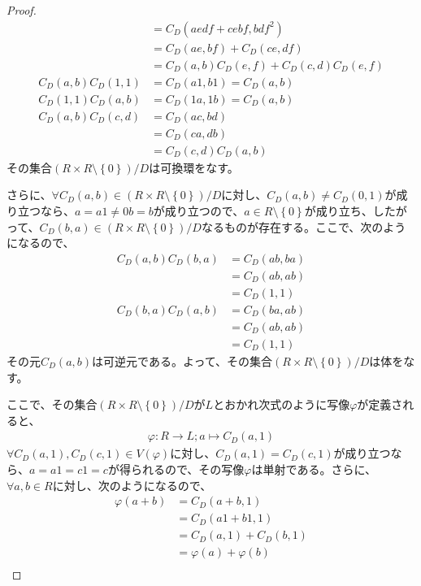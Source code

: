 \documentclass[dvipdfmx]{jsarticle}
\begin{document}
\begin{proof}
\begin{align*}
&= C_{D}\left( aedf + cebf,bdf^{2} \right)\\
&= C_{D}(ae,bf) + C_{D}(ce,df)\\
&= C_{D}(a,b)C_{D}(e,f) + C_{D}(c,d)C_{D}(e,f)\\
C_{D}(a,b)C_{D}(1,1) &= C_{D}(a1,b1) = C_{D}(a,b)\\
C_{D}(1,1)C_{D}(a,b) &= C_{D}(1a,1b) = C_{D}(a,b)\\
C_{D}(a,b)C_{D}(c,d) &= C_{D}(ac,bd)\\
&= C_{D}(ca,db)\\
&= C_{D}(c,d)C_{D}(a,b)
\end{align*}
その集合${\left( R \times R \setminus \left\{ 0 \right\} \right)}/{D}$は可換環をなす。\par
さらに、$\forall C_{D}(a,b) \in {\left( R \times R \setminus \left\{ 0 \right\} \right)}/{D}$に対し、$C_{D}(a,b) \neq C_{D}(0,1)$が成り立つなら、$a = a1 \neq 0b = b$が成り立つので、$a \in R \setminus \left\{ 0 \right\}$が成り立ち、したがって、$C_{D}(b,a) \in {\left( R \times R \setminus \left\{ 0 \right\} \right)}/{D}$なるものが存在する。ここで、次のようになるので、
\begin{align*}
C_{D}(a,b)C_{D}(b,a) &= C_{D}(ab,ba)\\
&= C_{D}(ab,ab)\\
&= C_{D}(1,1)\\
C_{D}(b,a)C_{D}(a,b) &= C_{D}(ba,ab)\\
&= C_{D}(ab,ab)\\
&= C_{D}(1,1)
\end{align*}
その元$C_{D}(a,b)$は可逆元である。よって、その集合${\left( R \times R \setminus \left\{ 0 \right\} \right)}/{D}$は体をなす。\par
ここで、その集合${\left( R \times R \setminus \left\{ 0 \right\} \right)}/{D}$が$L$とおかれ次式のように写像$\varphi$が定義されると、
\begin{align*}
\varphi:R \rightarrow L;a \mapsto C_{D}(a,1)
\end{align*}
$\forall C_{D}\left( a,1 \right),C_{D}\left( c,1 \right) \in V(\varphi)$に対し、$C_{D}\left( a,1 \right) = C_{D}\left( c,1 \right)$が成り立つなら、$a = a1 = c1 = c$が得られるので、その写像$\varphi$は単射である。さらに、$\forall a,b \in R$に対し、次のようになるので、
\begin{align*}
\varphi(a + b) &= C_{D}(a + b,1)\\
&= C_{D}(a1 + b1,1)\\
&= C_{D}(a,1) + C_{D}(b,1)\\
&= \varphi(a) + \varphi(b)\\

\end{align*}
\end{proof}
\end{document}
